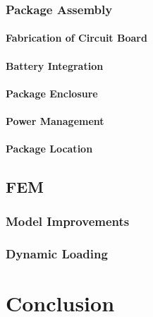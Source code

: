 \documentclass[twoside,11pt]{report}
\begin{document}
		\subsection{Package Assembly}
			\subsubsection{Fabrication of Circuit Board}
			\subsubsection{Battery Integration}
			\subsubsection{Package Enclosure}
			\subsubsection{Power Management}
			\subsubsection{Package Location}
	\section{FEM}
		\subsection{Model Improvements}
		\subsection{Dynamic Loading}
\chapter{Conclusion}
	
\end{document}
